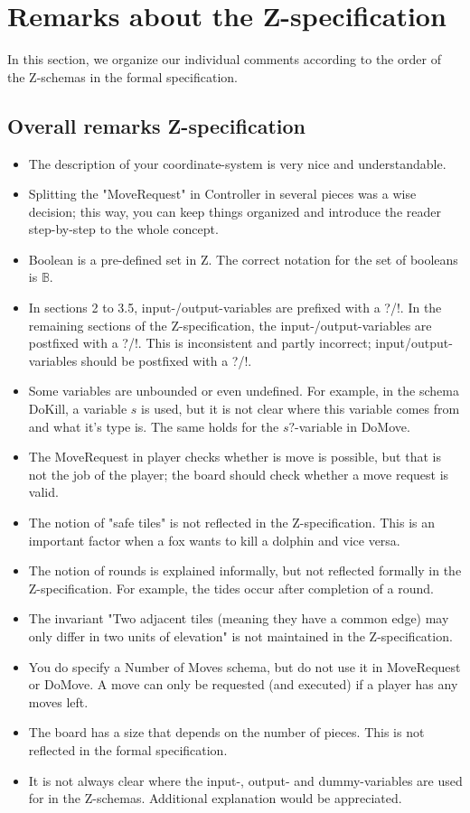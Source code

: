 \documentclass[a4paper,11pt]{article}
\begin{document}
	\section{Remarks about the Z-specification}
    In this section, we organize our individual comments according to the order of the Z-schemas in the formal specification.
    \subsection{Overall remarks Z-specification}
    \begin{itemize}
        \item The description of your coordinate-system is very nice and understandable.
        \item Splitting the "MoveRequest" in Controller in several pieces was a wise decision; this way, you can keep things organized and introduce the reader step-by-step to the whole concept.
        \item Boolean is a pre-defined set in Z. The correct notation for the set of booleans is $\mathds{B}$.
        \item In sections 2 to  3.5, input-/output-variables are prefixed with a ?/!. In the remaining sections of the Z-specification, the input-/output-variables are postfixed with a ?/!. This is inconsistent and partly incorrect; input/output-variables should be postfixed with a ?/!.
        \item Some variables are unbounded or even undefined. For example, in the schema DoKill, a variable $s$ is used, but it is not clear where this variable comes from and what it's type is. The same holds for the $s?$-variable in DoMove.
        \item The MoveRequest in player checks whether is move is possible, but that is not the job of the player; the board should check whether a move request is valid.
        \item The notion of "safe tiles" is not reflected in the Z-specification. This is an important factor when a fox wants to kill a dolphin and vice versa.
        \item The notion of rounds is explained informally, but not reflected formally in the Z-specification. For example, the tides occur after completion of a round.
        \item The invariant "Two adjacent tiles (meaning they have a common edge) may only differ in two units of elevation" is not maintained in the Z-specification.
        \item You do specify a Number of Moves schema, but do not use it in MoveRequest or DoMove. A move can only be requested (and executed) if a player has any moves left.
        \item The board has a size that depends on the number of pieces. This is not reflected in the formal specification.
        \item It is not always clear where the input-, output- and dummy-variables are used for in the Z-schemas. Additional explanation would be appreciated.
    \end{itemize}
\end{document}
